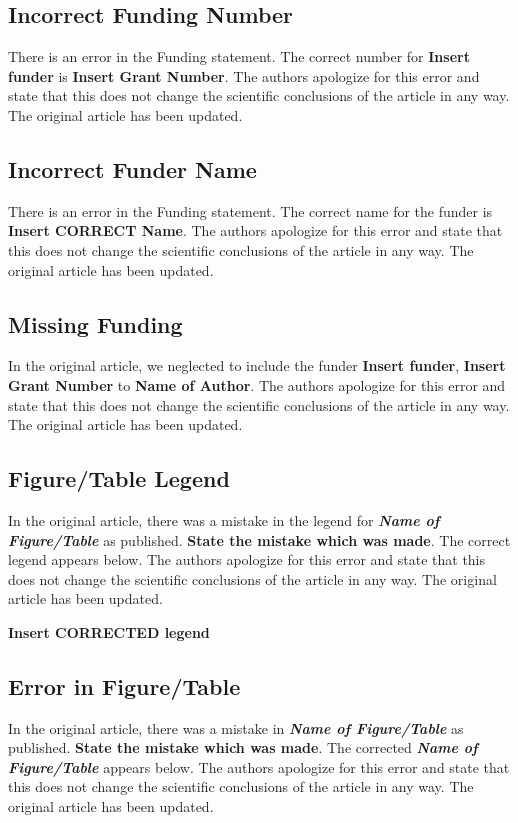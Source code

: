 \documentclass[utf8]{frontiers_correction}
\begin{document}
\subsection*{Incorrect Funding Number}
There is an error in the Funding statement. The correct number for \textbf{Insert funder} is \textbf{Insert Grant Number}. The authors apologize for this error and state that this does not change the scientific conclusions of the article in any way. The original article has been updated.

\subsection*{Incorrect Funder Name}
There is an error in the Funding statement. The correct name for the funder is \textbf{Insert CORRECT Name}. The authors apologize for this error and state that this does not change the scientific conclusions of the article in any way. The original article has been updated.

\subsection*{Missing Funding}
In the original article, we neglected to include the funder \textbf{Insert funder}, \textbf{Insert Grant Number} to \textbf{Name of Author}. The authors apologize for this error and state that this does not change the scientific conclusions of the article in any way. The original article has been updated.


\subsection*{Figure/Table Legend}
In the original article, there was a mistake in the legend for \textbf{\textit{Name of Figure/Table}} as published. \textbf{State the mistake which was made}. The correct legend appears below. The authors apologize for this error and state that this does not change the scientific conclusions of the article in any way. The original article has been updated.\par

\textbf{Insert CORRECTED legend}\par

\subsection*{Error in Figure/Table}
In the original article, there was a mistake in \textbf{\textit{Name of Figure/Table}} as published. \textbf{State the mistake which was made}. The corrected \textbf{\textit{Name of Figure/Table}} appears below. The authors apologize for this error and state that this does not change the scientific conclusions of the article in any way. The original article has been updated.\par
\end{document}
